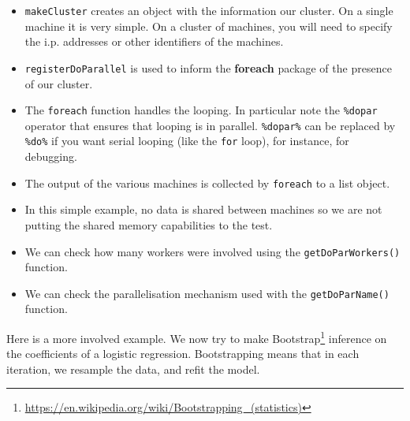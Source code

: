 \documentclass[]{book}
\newenvironment{Shaded}{\begin{snugshade}}{\end{snugshade}}
\newcommand{\DataTypeTok}[1]{\textcolor[rgb]{0.13,0.29,0.53}{#1}}
\newcommand{\DecValTok}[1]{\textcolor[rgb]{0.00,0.00,0.81}{#1}}
\newcommand{\FloatTok}[1]{\textcolor[rgb]{0.00,0.00,0.81}{#1}}
\newcommand{\KeywordTok}[1]{\textcolor[rgb]{0.13,0.29,0.53}{\textbf{#1}}}
\newcommand{\NormalTok}[1]{#1}
\newcommand{\OperatorTok}[1]{\textcolor[rgb]{0.81,0.36,0.00}{\textbf{#1}}}
\newcommand{\OtherTok}[1]{\textcolor[rgb]{0.56,0.35,0.01}{#1}}
\newcommand{\StringTok}[1]{\textcolor[rgb]{0.31,0.60,0.02}{#1}}
\providecommand{\tightlist}{%
  \setlength{\itemsep}{0pt}\setlength{\parskip}{0pt}}
\renewcommand{\href}[2]{#2\footnote{\url{#1}}}
\theoremstyle{definition}
\theoremstyle{definition}
\theoremstyle{definition}
\theoremstyle{remark}
\begin{document}
\begin{itemize}
\tightlist
\item
  \texttt{makeCluster} creates an object with the information our cluster.
  On a single machine it is very simple. On a cluster of machines, you will need to specify the i.p. addresses or other identifiers of the machines.
\item
  \texttt{registerDoParallel} is used to inform the \textbf{foreach} package of the presence of our cluster.
\item
  The \texttt{foreach} function handles the looping. In particular note the \texttt{\%dopar} operator that ensures that looping is in parallel. \texttt{\%dopar\%} can be replaced by \texttt{\%do\%} if you want serial looping (like the \texttt{for} loop), for instance, for debugging.
\item
  The output of the various machines is collected by \texttt{foreach} to a list object.
\item
  In this simple example, no data is shared between machines so we are not putting the shared memory capabilities to the test.
\item
  We can check how many workers were involved using the \texttt{getDoParWorkers()} function.
\item
  We can check the parallelisation mechanism used with the \texttt{getDoParName()} function.
\end{itemize}

Here is a more involved example.
We now try to make \href{https://en.wikipedia.org/wiki/Bootstrapping_(statistics)}{Bootstrap} inference on the coefficients of a logistic regression.
Bootstrapping means that in each iteration, we resample the data, and refit the model.

\begin{Shaded}
\end{Shaded}
\end{document}
